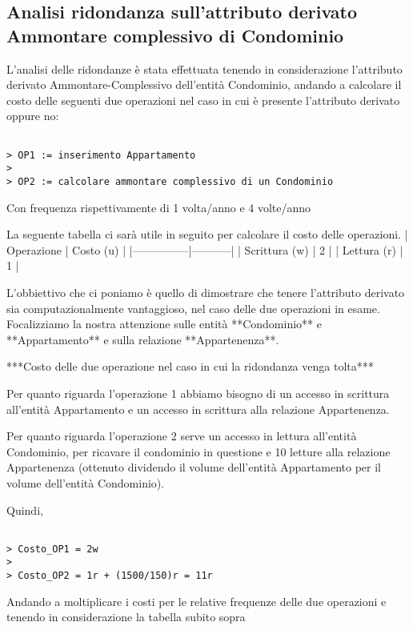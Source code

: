 \subsection{Analisi ridondanza sull'attributo derivato Ammontare complessivo di Condominio}

L'analisi delle ridondanze è stata effettuata tenendo in considerazione l'attributo derivato Ammontare-Complessivo dell'entità Condominio, andando a calcolare il costo delle seguenti due operazioni nel caso in cui è presente l'attributo derivato oppure no:

\begin{verbatim}

> OP1 := inserimento Appartamento
> 
> OP2 := calcolare ammontare complessivo di un Condominio

\end{verbatim}

Con frequenza rispettivamente di 1 volta/anno e 4 volte/anno

La seguente tabella ci sarà utile in seguito per calcolare il costo delle operazioni.
| Operazione    | Costo (u) |
|---------------|-----------|
| Scrittura (w) | 2         |
| Lettura (r)   | 1         |

L'obbiettivo che ci poniamo è quello di dimostrare che tenere l'attributo derivato sia computazionalmente vantaggioso, nel caso delle due operazioni in esame. Focalizziamo la nostra attenzione sulle entità **Condominio** e **Appartamento** e sulla relazione **Appartenenza**.

***Costo delle due operazione nel caso in cui la ridondanza venga tolta***

Per quanto riguarda l'operazione 1 abbiamo bisogno di un accesso in scrittura all'entità Appartamento e un accesso in scrittura alla relazione Appartenenza.

Per quanto riguarda l'operazione 2 serve un accesso in lettura all'entità Condominio, per ricavare il condominio in questione e 10 letture alla relazione Appartenenza (ottenuto dividendo il volume dell'entità Appartamento per il volume dell'entità Condominio).

Quindi,

\begin{verbatim}
	
> Costo_OP1 = 2w
> 
> Costo_OP2 = 1r + (1500/150)r = 11r

\end{verbatim}

Andando a moltiplicare i costi per le relative frequenze delle due operazioni e tenendo in considerazione la tabella subito sopra

